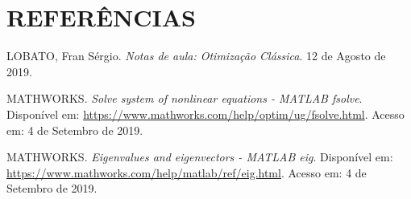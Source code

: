 \documentclass[12pt]{article}
\begin{document}
	\section*{REFERÊNCIAS} %
	\begingroup
	\renewcommand{\section}[2]{} %
	\begin{thebibliography}{99}
		
		 LOBATO, Fran Sérgio. \textit{Notas de aula: Otimização Clássica}. 12 de Agosto de 2019.
		
		 MATHWORKS. \textit{Solve system of nonlinear equations - MATLAB fsolve}. Disponível em: \url{https://www.mathworks.com/help/optim/ug/fsolve.html}. Acesso em: 4 de Setembro de 2019. 

		 MATHWORKS. \textit{Eigenvalues and eigenvectors - MATLAB eig}. Disponível em: \url{https://www.mathworks.com/help/matlab/ref/eig.html}. Acesso em: 4 de Setembro de 2019. 
		
	\end{thebibliography}
	\endgroup 
	
	\newpage
	\section*{ANEXO A}
	
\end{document}
